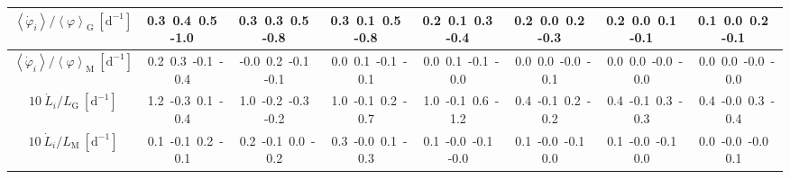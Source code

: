 \begin{table}[H]
{\begin{centering}
\begin{tabular}{|c|c|c|c|c|c|c|c|}
$\left\langle \dot{\varphi}_{i}\right\rangle /\left\langle \varphi\right\rangle _{\mathrm{G}}\ \left[\mathrm{d^{-1}}\right]$ & \textcolor{C1}{0.3}\ \textcolor{C2}{0.4}\ \textcolor{C3}{0.5}\ \textcolor{C4}{-1.0}\  & \textcolor{C1}{0.3}\ \textcolor{C2}{0.3}\ \textcolor{C3}{0.5}\ \textcolor{C4}{-0.8}\  & \textcolor{C1}{0.3}\ \textcolor{C2}{0.1}\ \textcolor{C3}{0.5}\ \textcolor{C4}{-0.8}\  & \textcolor{C1}{0.2}\ \textcolor{C2}{0.1}\ \textcolor{C3}{0.3}\ \textcolor{C4}{-0.4}\  & \textcolor{C1}{0.2}\ \textcolor{C2}{0.0}\ \textcolor{C3}{0.2}\ \textcolor{C4}{-0.3}\  & \textcolor{C1}{0.2}\ \textcolor{C2}{0.0}\ \textcolor{C3}{0.1}\ \textcolor{C4}{-0.1}\  & \textcolor{C1}{0.1}\ \textcolor{C2}{0.0}\ \textcolor{C3}{0.2}\ \textcolor{C4}{-0.1}\  \tabularnewline
\hline
$\left\langle \dot{\varphi}_{i}\right\rangle /\left\langle \varphi\right\rangle _{\mathrm{M}}\ \left[\mathrm{d^{-1}}\right]$ & \textcolor{C1}{0.2}\ \textcolor{C2}{0.3}\ \textcolor{C3}{-0.1}\ \textcolor{C4}{-0.4}\  & \textcolor{C1}{-0.0}\ \textcolor{C2}{0.2}\ \textcolor{C3}{-0.1}\ \textcolor{C4}{-0.1}\  & \textcolor{C1}{0.0}\ \textcolor{C2}{0.1}\ \textcolor{C3}{-0.1}\ \textcolor{C4}{-0.1}\  & \textcolor{C1}{0.0}\ \textcolor{C2}{0.1}\ \textcolor{C3}{-0.1}\ \textcolor{C4}{-0.0}\  & \textcolor{C1}{0.0}\ \textcolor{C2}{0.0}\ \textcolor{C3}{-0.0}\ \textcolor{C4}{-0.1}\  & \textcolor{C1}{0.0}\ \textcolor{C2}{0.0}\ \textcolor{C3}{-0.0}\ \textcolor{C4}{-0.0}\  & \textcolor{C1}{0.0}\ \textcolor{C2}{0.0}\ \textcolor{C3}{-0.0}\ \textcolor{C4}{-0.0}\  \tabularnewline
\hline
$10\ \dot{L}_{i}/L_{\mathrm{G}}\ \left[\mathrm{d^{-1}}\right]$ & \textcolor{C1}{1.2}\ \textcolor{C2}{-0.3}\ \textcolor{C3}{0.1}\ \textcolor{C4}{-0.4}\  & \textcolor{C1}{1.0}\ \textcolor{C2}{-0.2}\ \textcolor{C3}{-0.3}\ \textcolor{C4}{-0.2}\  & \textcolor{C1}{1.0}\ \textcolor{C2}{-0.1}\ \textcolor{C3}{0.2}\ \textcolor{C4}{-0.7}\  & \textcolor{C1}{1.0}\ \textcolor{C2}{-0.1}\ \textcolor{C3}{0.6}\ \textcolor{C4}{-1.2}\  & \textcolor{C1}{0.4}\ \textcolor{C2}{-0.1}\ \textcolor{C3}{0.2}\ \textcolor{C4}{-0.2}\  & \textcolor{C1}{0.4}\ \textcolor{C2}{-0.1}\ \textcolor{C3}{0.3}\ \textcolor{C4}{-0.3}\  & \textcolor{C1}{0.4}\ \textcolor{C2}{-0.0}\ \textcolor{C3}{0.3}\ \textcolor{C4}{-0.4}\  \tabularnewline
\hline
$10\ \dot{L}_{i}/L_{\mathrm{M}}\ \left[\mathrm{d^{-1}}\right]$ & \textcolor{C1}{0.1}\ \textcolor{C2}{-0.1}\ \textcolor{C3}{0.2}\ \textcolor{C4}{-0.1}\  & \textcolor{C1}{0.2}\ \textcolor{C2}{-0.1}\ \textcolor{C3}{0.0}\ \textcolor{C4}{-0.2}\  & \textcolor{C1}{0.3}\ \textcolor{C2}{-0.0}\ \textcolor{C3}{0.1}\ \textcolor{C4}{-0.3}\  & \textcolor{C1}{0.1}\ \textcolor{C2}{-0.0}\ \textcolor{C3}{-0.1}\ \textcolor{C4}{-0.0}\  & \textcolor{C1}{0.1}\ \textcolor{C2}{-0.0}\ \textcolor{C3}{-0.1}\ \textcolor{C4}{0.0}\  & \textcolor{C1}{0.1}\ \textcolor{C2}{-0.0}\ \textcolor{C3}{-0.1}\ \textcolor{C4}{0.0}\  & \textcolor{C1}{0.0}\ \textcolor{C2}{-0.0}\ \textcolor{C3}{-0.0}\ \textcolor{C4}{0.1}\  \tabularnewline

\end{tabular}
\end{centering}}
\end{table}
